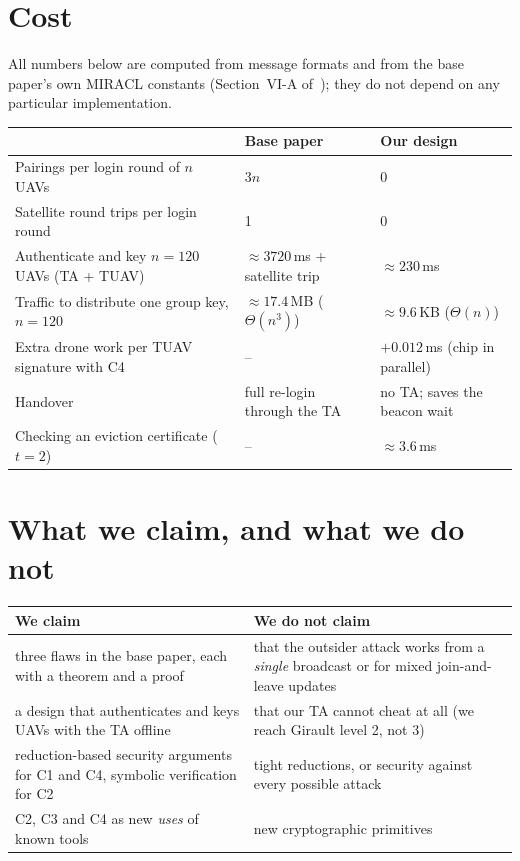 \section{Cost}
All numbers below are computed from message formats and from the base paper's own MIRACL constants (Section~VI-A of~\cite{tan2023}); they do not depend
on any particular implementation.
\begin{center}
\small
\begin{tabularx}{\linewidth}{@{}X l l@{}}
\toprule
& \textbf{Base paper} & \textbf{Our design}\\
\midrule
Pairings per login round of $n$ UAVs & $3n$ & 0\\
Satellite round trips per login round & 1 & 0\\
Authenticate and key $n=120$ UAVs (TA + TUAV) & $\approx3720$\,ms + satellite trip & $\approx230$\,ms\\
Traffic to distribute one group key, $n=120$ & $\approx17.4$\,MB ($\Theta(n^3)$) & $\approx9.6$\,KB ($\Theta(n)$)\\
Extra drone work per TUAV signature with C4 & -- & $+0.012$\,ms (chip in parallel)\\
Handover & full re-login through the TA & no TA; saves the beacon wait\\
Checking an eviction certificate ($t=2$) & -- & $\approx3.6$\,ms\\
\bottomrule
\end{tabularx}
\end{center}

\section{What we claim, and what we do not}
\begin{center}
\small
\begin{tabularx}{\linewidth}{@{}X X@{}}
\toprule
\textcolor{good}{\textbf{We claim}} & \textcolor{bad}{\textbf{We do not claim}}\\
\midrule
three flaws in the base paper, each with a theorem and a proof & that the outsider attack works from a \emph{single} broadcast or for mixed join-and-leave updates\\
a design that authenticates and keys UAVs with the TA offline & that our TA cannot cheat at all (we reach Girault level 2, not 3)\\
reduction-based security arguments for C1 and C4, symbolic verification for C2 & tight reductions, or security against every possible attack\\
C2, C3 and C4 as new \emph{uses} of known tools & new cryptographic primitives\\
\bottomrule
\end{tabularx}
\end{center}
